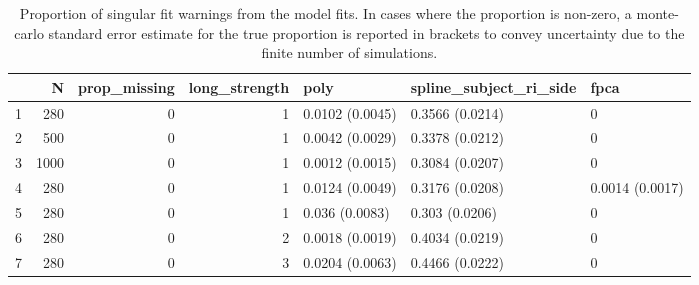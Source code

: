 \begin{table}[ht]
\centering
\begin{tabular}{lrrrlll}
  \toprule
 & {\bfseries N} & {\bfseries prop_missing} & {\bfseries long_strength} & {\bfseries poly} & {\bfseries spline_subject_ri_side} & {\bfseries fpca} \\ 
  \midrule
1 & 280 & 0 & 1 & 0.0102 (0.0045) & 0.3566 (0.0214) & 0 \\ 
  2 & 500 & 0 & 1 & 0.0042 (0.0029) & 0.3378 (0.0212) & 0 \\ 
  3 & 1000 & 0 & 1 & 0.0012 (0.0015) & 0.3084 (0.0207) & 0 \\ 
  4 & 280 & 0 & 1 & 0.0124 (0.0049) & 0.3176 (0.0208) & 0.0014 (0.0017) \\ 
  5 & 280 & 0 & 1 & 0.036 (0.0083) & 0.303 (0.0206) & 0 \\ 
  6 & 280 & 0 & 2 & 0.0018 (0.0019) & 0.4034 (0.0219) & 0 \\ 
  7 & 280 & 0 & 3 & 0.0204 (0.0063) & 0.4466 (0.0222) & 0 \\ 
   \bottomrule
\end{tabular}
\caption{Proportion of singular fit warnings from the model fits. In cases where the proportion is non-zero, a monte-carlo standard error estimate for the true proportion is reported in brackets to convey uncertainty due to the finite number of simulations.} 
\label{tab:singularity-table}
\end{table}
